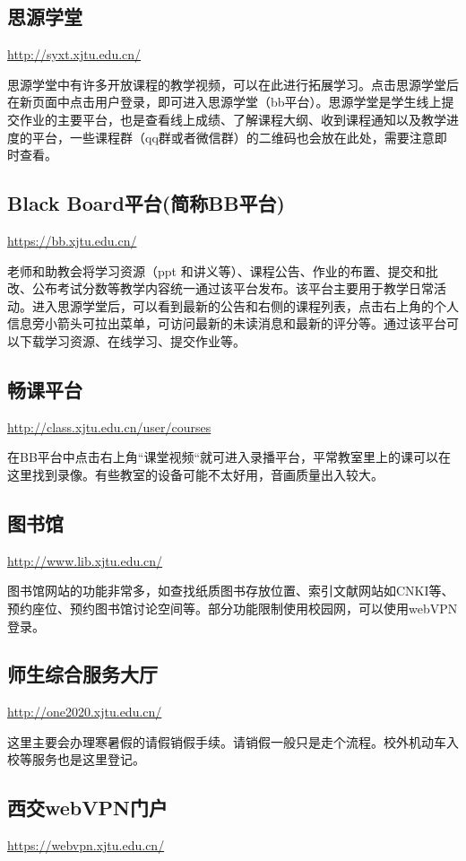 \documentclass[
decoration,  %
]{qyxf-book}
\begin{document}
\subsection{思源学堂}
\url{http://syxt.xjtu.edu.cn/}

思源学堂中有许多开放课程的教学视频，可以在此进行拓展学习。点击思源学堂后在新页面中点击用户登录，即可进入思源学堂（bb平台）。思源学堂是学生线上提交作业的主要平台，也是查看线上成绩、了解课程大纲、收到课程通知以及教学进度的平台，一些课程群（qq群或者微信群）的二维码也会放在此处，需要注意即时查看。

\subsection{Black Board平台(简称BB平台)}
\url{https://bb.xjtu.edu.cn/}

老师和助教会将学习资源（ppt 和讲义等）、课程公告、作业的布置、提交和批改、公布考试分数等教学内容统一通过该平台发布。该平台主要用于教学日常活动。进入思源学堂后，可以看到最新的公告和右侧的课程列表，点击右上角的个人信息旁小箭头可拉出菜单，可访问最新的未读消息和最新的评分等。通过该平台可以下载学习资源、在线学习、提交作业等。 

\subsection{畅课平台}
\url{http://class.xjtu.edu.cn/user/courses}

在BB平台中点击右上角“课堂视频“就可进入录播平台，平常教室里上的课可以在这里找到录像。有些教室的设备可能不太好用，音画质量出入较大。

\subsection{图书馆}
\url{http://www.lib.xjtu.edu.cn/}

图书馆网站的功能非常多，如查找纸质图书存放位置、索引文献网站如CNKI等、预约座位、预约图书馆讨论空间等。部分功能限制使用校园网，可以使用webVPN登录。

\subsection{师生综合服务大厅}
\url{http://one2020.xjtu.edu.cn/}

这里主要会办理寒暑假的请假销假手续。请销假一般只是走个流程。校外机动车入校等服务也是这里登记。

\subsection{西交webVPN门户}
\url{https://webvpn.xjtu.edu.cn/}
\end{document}
